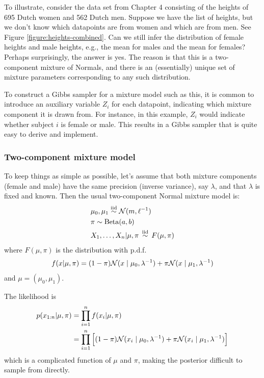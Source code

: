 \documentclass[12pt]{article}
\begin{document}
To illustrate, consider the data set from Chapter 4 consisting of the heights of 695 Dutch women and 562 Dutch men.  Suppose we have the list of heights, but we don't know which datapoints
are from women and which are from men.  See Figure \ref{figure:heights-combined}.
Can we still infer the distribution of female heights and male heights, e.g., the mean for males and the mean for females?  
Perhaps surprisingly, the answer is yes.  The reason is that this is a two-component mixture of Normals,
and there is an (essentially) unique set of mixture parameters corresponding to any such distribution.

To construct a Gibbs sampler for a mixture model such as this, it is common to introduce an auxiliary variable $Z_i$ for each datapoint,
indicating which mixture component it is drawn from. For instance, in this example, $Z_i$ would indicate whether subject $i$ is female or male.
This results in a Gibbs sampler that is quite easy to derive and implement.

\subsubsection{Two-component mixture model}
To keep things as simple as possible, let's assume that both mixture components (female and male) have the same precision
(inverse variance), say $\lambda$, and that $\lambda$ is fixed and known.  Then the usual two-component Normal mixture model is:
\begin{align*}
    & \mu_0,\mu_1 \stackrel{\mathrm{iid}}{\sim} \mathcal{N}(m,\ell^{-1})\\
    & \pi \sim \operatorname*{Beta}(a,b)\\
    & X_1,\ldots,X_n|\mu,\pi\,\stackrel{\mathrm{iid}}{\sim}\,F(\mu,\pi)
\end{align*}
where $F(\mu,\pi)$ is the distribution with p.d.f. 
$$ f(x|\mu,\pi) = (1-\pi)\mathcal{N}(x\mid \mu_0,\lambda^{-1}) + \pi\mathcal{N}(x\mid \mu_1,\lambda^{-1}) $$
and $\mu=(\mu_0,\mu_1)$.

The likelihood is
\begin{align*}
    p(x_{1:n}|\mu,\pi) &= \prod_{i=1}^n f(x_i|\mu,\pi) \\
                       & = \prod_{i=1}^n \Big[ (1-\pi)\mathcal{N}(x_i\mid \mu_0,\lambda^{-1}) + \pi\mathcal{N}(x_i\mid \mu_1,\lambda^{-1}) \Big] 
\end{align*}
which is a complicated function of $\mu$ and $\pi$, making the posterior difficult to sample from directly.
\end{document}
